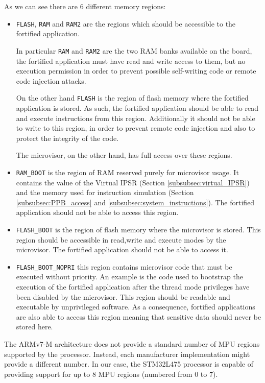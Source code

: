 \documentclass{article}
\begin{document}
As we can see there are 6 different memory regions:
\begin{itemize}
	\item \verb|FLASH|, \verb|RAM| and \verb|RAM2| are the regions which should be accessible to the fortified application.
	
	In particular \verb|RAM| and \verb|RAM2| are the two RAM banks available on the board, the fortified application must have read and write access to them, but no execution permission in order to prevent possible self-writing code or remote code injection attacks.
	
	On the other hand \verb|FLASH| is the region of flash memory where the fortified application is stored. As such, the fortified application should be able to read and execute instructions from this region. Additionally it should not be able to write to this region, in order to prevent remote code injection and also to protect the integrity of the code.
	
	The microvisor, on the other hand, has full access over these regions.
	
	\item \verb|RAM_BOOT| is the region of RAM reserved purely for microvisor usage. It contains the value of the Virtual IPSR (Section \ref{subsubsec:virtual_IPSR}) and the memory used for instruction simulation (Section \ref{subsubsec:PPB_access} and \ref{subsubsec:system_instructions}). The fortified application should not be able to access this region.
	
	\item \verb|FLASH_BOOT| is the region of flash memory where the microvisor is stored. This region should be accessible in read,write and execute modes by the microvisor. The fortified application should not be able to access it.
	
	\item \verb|FLASH_BOOT_NOPRI| this region contains microvisor code that must be executed without priority. An example is the code used to bootstrap the execution of the fortified application after the thread mode privileges have been disabled by the microvisor. This region should be readable and executable by unprivileged software. As a consequence, fortified applications are also able to access this region meaning that sensitive data should never be stored here.
\end{itemize}

The ARMv7-M architecture does not provide a standard number of MPU regions supported by the processor. Instead, each manufacturer implementation might provide a different number. In our case, the STM32L475 processor is capable of providing support for up to 8 MPU regions (numbered from 0 to 7).
\end{document}
